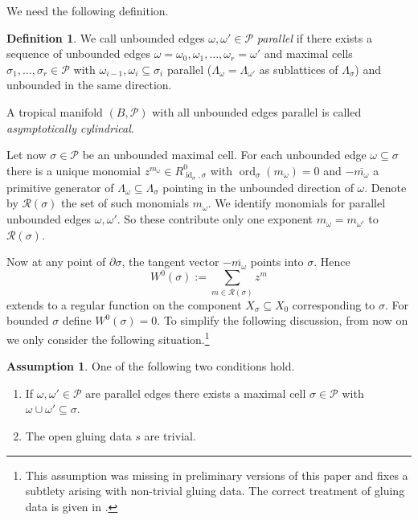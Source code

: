 \documentclass[11pt,letter]{amsart}
\theoremstyle{definition}
\newtheorem{definition}[theorem]{Definition}
\newtheorem{assumption}[theorem]{Assumption}
\theoremstyle{remark}
\numberwithin{equation}{section}
\numberwithin{figure}{section}
\newcommand {\id}  {\operatorname{id}}
\newcommand {\ord}  {\operatorname{ord}}
\renewcommand{\P}  {\mathscr{P}}
\newcommand {\scrR}  {\mathscr{R}}
\begin{document}
We need the following definition.

\begin{definition}
\label{Def: parallel edges}
We call unbounded edges $\omega,\omega'\in\P$ \emph{parallel} if there exists a
sequence of unbounded edges $\omega=\omega_0,\omega_1,\ldots,\omega_r=\omega'$
and maximal cells $\sigma_1,\ldots,\sigma_r\in\P$ with
$\omega_{i-1},\omega_i\subseteq\sigma_i$ parallel
($\Lambda_{\omega}=\Lambda_{\omega'}$ as sublattices of $\Lambda_\sigma$) and
unbounded in the same direction.

A tropical manifold $(B,\P)$ with all unbounded edges parallel is
called \emph{asymptotically cylindrical}.
\end{definition}

Let now $\sigma\in\P$ be an unbounded maximal cell. For each unbounded edge
$\omega\subseteq \sigma$ there is a unique monomial $z^{m_\omega}\in
R^0_{\id_\sigma,\sigma}$ with $\ord_\sigma (m_\omega)=0$ and
$-\overline{m_\omega}$ a primitive generator of $\Lambda_\omega\subseteq
\Lambda_\sigma$ pointing in the unbounded direction of $\omega$. Denote by
$\scrR(\sigma)$ the set of such monomials $m_\omega$. We identify monomials for
parallel unbounded edges $\omega,\omega'$. So these contribute only one exponent
$m_\omega= m_{\omega'}$ to $\scrR(\sigma)$.

Now at any point of $\partial\sigma$, the tangent vector $-\overline{m_\omega}$
points into $\sigma$. Hence
\begin{equation}
\label{Eqn: W^0(sigma)}
W^0(\sigma):= \sum_{m\in \scrR(\sigma)}
z^m
\end{equation}
extends to a regular function on the component $X_{\sigma}\subseteq X_0$
corresponding to $\sigma$. For bounded $\sigma$ define $W^0(\sigma)=0$. To
simplify the following discussion, from now on we only consider the following
situation.\footnote{This assumption was missing in preliminary versions of this
paper and fixes a subtlety arising with non-trivial gluing data. The correct
treatment of gluing data is given in \cite[\S5.2]{Theta}.}

\begin{assumption}
\label{Ass: trivial gluing data}
One of the following two conditions hold.
\begin{enumerate}
\item
If $\omega,\omega'\in \P$ are parallel edges there exists a maximal cell $\sigma\in\P$ with $\omega\cup\omega'\subseteq \sigma$.
\item
The open gluing data $s$ are trivial.
\end{enumerate}
\end{assumption}
\end{document}

